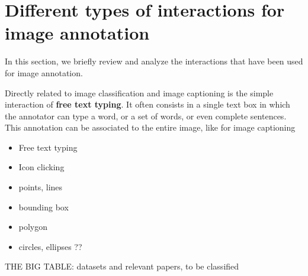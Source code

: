 \section{Different types of interactions for image annotation}
\label{sec:annotation-types}
In this section, we briefly review and analyze the interactions that have been used for image annotation. 

Directly related to image classification and image captioning is the simple interaction of \textbf{free text typing}. It often consists in a single text box in which the annotator can type a word, or a set of words, or even complete sentences. This annotation can be associated to the entire image, like for image captioning 

\begin{itemize}
	\item Free text typing
	\item Icon clicking
	\item points, lines
	\item bounding box
	\item polygon
	\item circles, ellipses ??
\end{itemize}


THE BIG TABLE: datasets and relevant papers, to be classified


